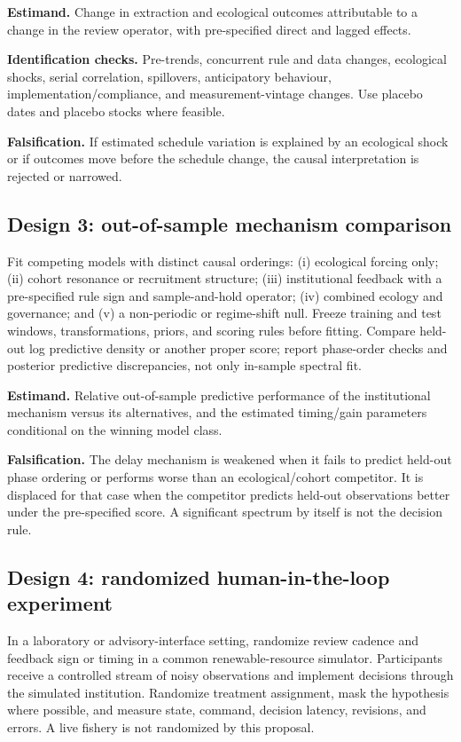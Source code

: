 \textbf{Estimand.} Change in extraction and ecological outcomes attributable to a change in the review operator, with pre-specified direct and lagged effects.

\textbf{Identification checks.} Pre-trends, concurrent rule and data changes, ecological shocks, serial correlation, spillovers, anticipatory behaviour, implementation/compliance, and measurement-vintage changes. Use placebo dates and placebo stocks where feasible.

\textbf{Falsification.} If estimated schedule variation is explained by an ecological shock or if outcomes move before the schedule change, the causal interpretation is rejected or narrowed.

\subsection{Design 3: out-of-sample mechanism comparison}

Fit competing models with distinct causal orderings: (i) ecological forcing only; (ii) cohort resonance or recruitment structure; (iii) institutional feedback with a pre-specified rule sign and sample-and-hold operator; (iv) combined ecology and governance; and (v) a non-periodic or regime-shift null. Freeze training and test windows, transformations, priors, and scoring rules before fitting. Compare held-out log predictive density or another proper score; report phase-order checks and posterior predictive discrepancies, not only in-sample spectral fit.

\textbf{Estimand.} Relative out-of-sample predictive performance of the institutional mechanism versus its alternatives, and the estimated timing/gain parameters conditional on the winning model class.

\textbf{Falsification.} The delay mechanism is weakened when it fails to predict held-out phase ordering or performs worse than an ecological/cohort competitor. It is displaced for that case when the competitor predicts held-out observations better under the pre-specified score. A significant spectrum by itself is not the decision rule.

\subsection{Design 4: randomized human-in-the-loop experiment}

In a laboratory or advisory-interface setting, randomize review cadence and feedback sign or timing in a common renewable-resource simulator. Participants receive a controlled stream of noisy observations and implement decisions through the simulated institution. Randomize treatment assignment, mask the hypothesis where possible, and measure state, command, decision latency, revisions, and errors. A live fishery is not randomized by this proposal.


